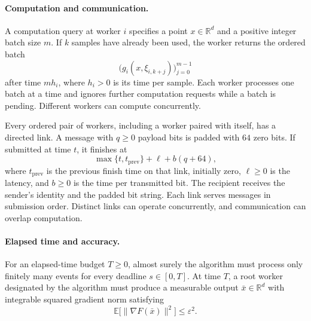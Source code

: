 \documentclass[10pt]{article}
\theoremstyle{definition}
\begin{document}
\paragraph{Computation and communication.}
A computation query at worker $i$ specifies a point $x\in\mathbb{R}^d$ and a positive integer batch size $m$. If $k$ samples have already been used, the worker returns the ordered batch
\[
\bigl(g_i(x,\xi_{i,k+j})\bigr)_{j=0}^{m-1}
\]
after time $m h_i$, where $h_i>0$ is its time per sample. Each worker processes one batch at a time and ignores further computation requests while a batch is pending. Different workers can compute concurrently.

Every ordered pair of workers, including a worker paired with itself, has a directed link. A message with $q\geq 0$ payload bits is padded with $64$ zero bits. If submitted at time $t$, it finishes at
\[
\max\{t,t_{\mathrm{prev}}\}+\ell+b(q+64),
\]
where $t_{\mathrm{prev}}$ is the previous finish time on that link, initially zero, $\ell\geq 0$ is the latency, and $b\geq 0$ is the time per transmitted bit. The recipient receives the sender's identity and the padded bit string. Each link serves messages in submission order. Distinct links can operate concurrently, and communication can overlap computation.

\paragraph{Elapsed time and accuracy.}
For an elapsed-time budget $T\geq 0$, almost surely the algorithm must process only finitely many events for every deadline $s\in[0,T]$. At time $T$, a root worker designated by the algorithm must produce a measurable output $\bar{x}\in\mathbb{R}^d$ with integrable squared gradient norm satisfying
\[
\mathbb{E}\bigl[\|\nabla F(\bar{x})\|^2\bigr]\leq\varepsilon^2.
\]
\end{document}
